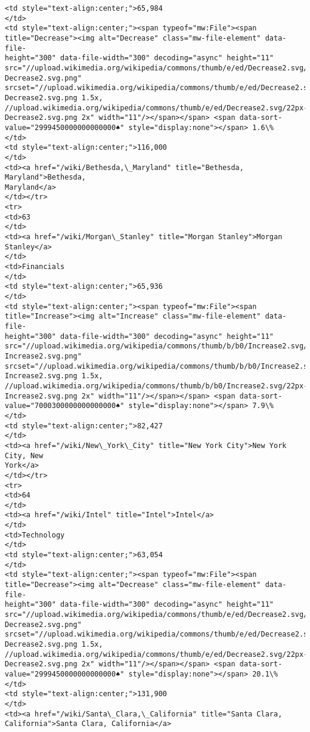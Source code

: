 \documentclass[11pt]{article}
\begin{document}
\begin{Verbatim}[commandchars=\\\{\}]
<td style="text-align:center;">65,984
</td>
<td style="text-align:center;"><span typeof="mw:File"><span
title="Decrease"><img alt="Decrease" class="mw-file-element" data-file-
height="300" data-file-width="300" decoding="async" height="11"
src="//upload.wikimedia.org/wikipedia/commons/thumb/e/ed/Decrease2.svg/11px-
Decrease2.svg.png"
srcset="//upload.wikimedia.org/wikipedia/commons/thumb/e/ed/Decrease2.svg/17px-
Decrease2.svg.png 1.5x,
//upload.wikimedia.org/wikipedia/commons/thumb/e/ed/Decrease2.svg/22px-
Decrease2.svg.png 2x" width="11"/></span></span> <span data-sort-
value="2999450000000000000♠" style="display:none"></span> 1.6\%
</td>
<td style="text-align:center;">116,000
</td>
<td><a href="/wiki/Bethesda,\_Maryland" title="Bethesda, Maryland">Bethesda,
Maryland</a>
</td></tr>
<tr>
<td>63
</td>
<td><a href="/wiki/Morgan\_Stanley" title="Morgan Stanley">Morgan Stanley</a>
</td>
<td>Financials
</td>
<td style="text-align:center;">65,936
</td>
<td style="text-align:center;"><span typeof="mw:File"><span
title="Increase"><img alt="Increase" class="mw-file-element" data-file-
height="300" data-file-width="300" decoding="async" height="11"
src="//upload.wikimedia.org/wikipedia/commons/thumb/b/b0/Increase2.svg/11px-
Increase2.svg.png"
srcset="//upload.wikimedia.org/wikipedia/commons/thumb/b/b0/Increase2.svg/17px-
Increase2.svg.png 1.5x,
//upload.wikimedia.org/wikipedia/commons/thumb/b/b0/Increase2.svg/22px-
Increase2.svg.png 2x" width="11"/></span></span> <span data-sort-
value="7000300000000000000♠" style="display:none"></span> 7.9\%
</td>
<td style="text-align:center;">82,427
</td>
<td><a href="/wiki/New\_York\_City" title="New York City">New York City, New
York</a>
</td></tr>
<tr>
<td>64
</td>
<td><a href="/wiki/Intel" title="Intel">Intel</a>
</td>
<td>Technology
</td>
<td style="text-align:center;">63,054
</td>
<td style="text-align:center;"><span typeof="mw:File"><span
title="Decrease"><img alt="Decrease" class="mw-file-element" data-file-
height="300" data-file-width="300" decoding="async" height="11"
src="//upload.wikimedia.org/wikipedia/commons/thumb/e/ed/Decrease2.svg/11px-
Decrease2.svg.png"
srcset="//upload.wikimedia.org/wikipedia/commons/thumb/e/ed/Decrease2.svg/17px-
Decrease2.svg.png 1.5x,
//upload.wikimedia.org/wikipedia/commons/thumb/e/ed/Decrease2.svg/22px-
Decrease2.svg.png 2x" width="11"/></span></span> <span data-sort-
value="2999450000000000000♠" style="display:none"></span> 20.1\%
</td>
<td style="text-align:center;">131,900
</td>
<td><a href="/wiki/Santa\_Clara,\_California" title="Santa Clara,
California">Santa Clara, California</a>

\end{Verbatim}
\end{document}
